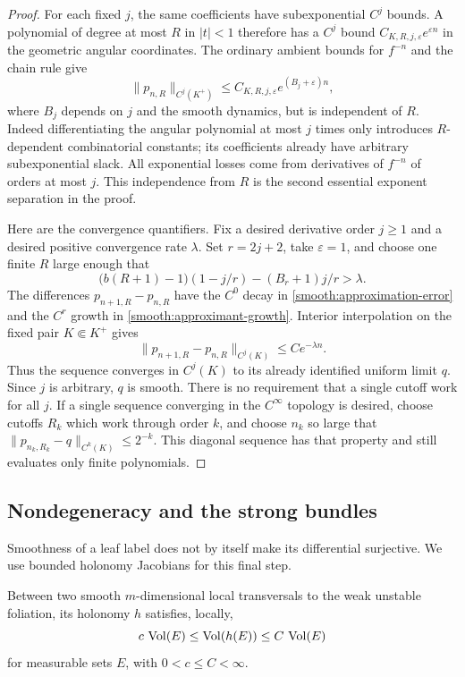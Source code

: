 \begin{proof}
For each fixed $j$, the same coefficients have subexponential
$C^j$ bounds.  A polynomial of degree at most $R$ in $|t|<1$ therefore
has a $C^j$ bound $C_{K,R,j,\varepsilon}e^{\varepsilon n}$ in the
geometric angular coordinates.  The ordinary ambient bounds for
$f^{-n}$ and the chain rule give
\begin{equation}
 \label{smooth:approximant-growth}
 \|p_{n,R}\|_{C^j(K^+)}
 \leq C_{K,R,j,\varepsilon}e^{(B_j+\varepsilon)n},
\end{equation}
where $B_j$ depends on $j$ and the smooth dynamics, but is independent
of $R$.  Indeed differentiating the angular polynomial at most $j$
times only introduces $R$-dependent combinatorial constants; its
coefficients already have arbitrary subexponential slack.  All
exponential losses come from derivatives of $f^{-n}$ of orders at most
$j$.  This independence from $R$ is the second essential exponent
separation in the proof.

Here are the convergence quantifiers.  Fix a desired derivative order
$j\geq1$ and a desired positive convergence rate $\lambda$.  Set
$r=2j+2$, take $\varepsilon=1$, and choose one finite $R$ large enough
that
\[
 \bigl(b(R+1)-1\bigr)(1-j/r)
       -(B_r+1)j/r>\lambda.
\]
The differences $p_{n+1,R}-p_{n,R}$ have the $C^0$ decay in
\eqref{smooth:approximation-error} and the $C^r$ growth in
\eqref{smooth:approximant-growth}.  Interior interpolation on the fixed
pair $K\Subset K^+$ gives
\[
 \|p_{n+1,R}-p_{n,R}\|_{C^j(K)}\leq C e^{-\lambda n}.
\]
Thus the sequence converges in $C^j(K)$ to its already identified
uniform limit $q$.  Since $j$ is arbitrary, $q$ is smooth.  There is no
requirement that a single cutoff work for all $j$.  If a single sequence
converging in the $C^\infty$ topology is desired, choose cutoffs $R_k$
which work through order $k$, and choose $n_k$ so large that
$\|p_{n_k,R_k}-q\|_{C^k(K)}\leq2^{-k}$.  This diagonal sequence has that
property and still evaluates only finite polynomials.
\end{proof}

\subsection{Nondegeneracy and the strong bundles}

Smoothness of a leaf label does not by itself make its differential
surjective.  We use bounded holonomy Jacobians for this final step.

\begin{lemma}
\label{smooth:holonomy-volume}
Between two smooth $m$-dimensional local transversals to the weak
unstable foliation, its holonomy $h$ satisfies, locally,
\[
 c\,\operatorname{Vol}(E)\leq\operatorname{Vol}(h(E))\leq C\,\operatorname{Vol}(E)
\]
for measurable sets $E$, with $0<c\leq C<\infty$.
\end{lemma}

